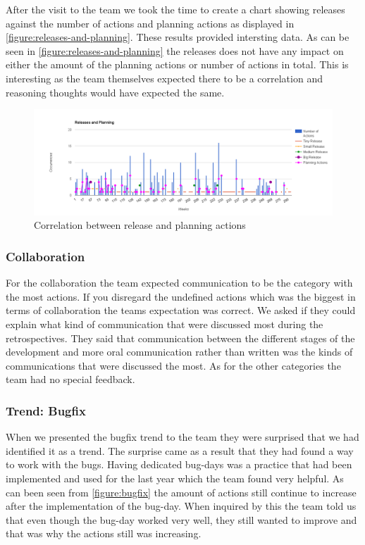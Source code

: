 After the visit to the team we took the time to create a chart showing releases against the number of actions and planning actions as displayed in \autoref{figure:releases-and-planning}. These results provided intersting data. As can be seen in \autoref{figure:releases-and-planning} the releases does not have any impact on either the amount of the planning actions or number of actions in total. This is interesting as the team themselves expected there to be a correlation and reasoning thoughts would have expected the same. 

\begin{figure}
	\centering
	\includegraphics[width=\textwidth, keepaspectratio]{figures/releases-and-planning.png}
	\caption{Correlation between release and planning actions}
	\label{figure:releases-and-planning}
\end{figure}
\afterpage{\clearpage}

\subsubsection{Collaboration}
For the collaboration the team expected communication to be the category with the most actions. If you disregard the undefined actions which was the biggest in terms of collaboration the teams expectation was correct. We asked if they could explain what kind of communication that were discussed most during the retrospectives. They said that communication between the different stages of the development and more oral communication rather than written was the kinds of communications that were discussed the most. As for the other categories the team had no special feedback.

\subsubsection{Trend: Bugfix}
When we presented the bugfix trend to the team they were surprised that we had identified it as a trend. The surprise came as a result that they had found a way to work with the bugs. Having dedicated bug-days was a practice that had been implemented and used for the last year which the team found very helpful. As can been seen from \autoref{figure:bugfix} the amount of actions still continue to increase after the implementation of the bug-day. When inquired by this the team told us that even though the bug-day worked very well, they still wanted to improve and that was why the actions still was increasing. 

